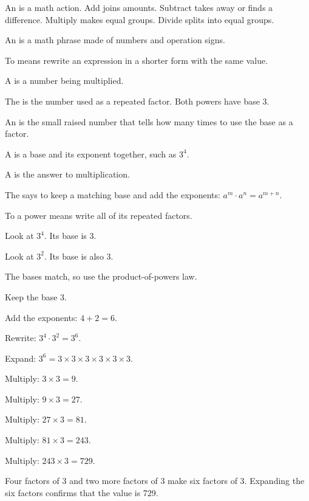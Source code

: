 \begin{words}
  \item An is a math action. Add joins amounts. Subtract takes
    away or finds a difference. Multiply makes equal groups. Divide splits into
    equal groups.
  \item An is a math phrase made of numbers and operation signs.
  \item To means rewrite an expression in a shorter form with the
    same value.
  \item A is a number being multiplied.
  \item The is the number used as a repeated factor. Both powers have
    base 3.
  \item An is the small raised number that tells how many times to
    use the base as a factor.
  \item A is a base and its exponent together, such as $3^{4}$.
  \item A is the answer to multiplication.
  \item The says to keep a matching base and add the
    exponents: $a^{m} \cdot a^{n} = a^{m+n}$.
  \item To a power means write all of its repeated factors.
\end{words}

\begin{steps}
  \item Look at $3^{4}$. Its base is 3.
  \item Look at $3^{2}$. Its base is also 3.
  \item The bases match, so use the product-of-powers law.
  \item Keep the base 3.
  \item Add the exponents: $4 + 2 = 6$.
  \item Rewrite: $3^{4} \cdot 3^{2} = 3^{6}$.
  \item Expand: $3^{6} = 3 \times 3 \times 3 \times 3 \times 3 \times 3$.
  \item Multiply: $3 \times 3 = 9$.
  \item Multiply: $9 \times 3 = 27$.
  \item Multiply: $27 \times 3 = 81$.
  \item Multiply: $81 \times 3 = 243$.
  \item Multiply: $243 \times 3 = 729$.
\end{steps}


Four factors of 3 and two more factors of 3 make six factors of 3. Expanding the
six factors confirms that the value is 729.
